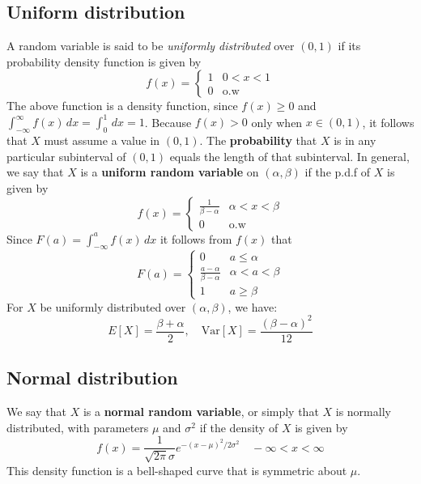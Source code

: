 \subsection{Uniform distribution}
A random variable is said to be \textit{uniformly distributed} over $(0,1)$ if its probability density function is given by \begin{equation}
    f(x)=\begin{cases}
        1& 0 < x < 1 \\
        0 & \mathrm{o.w}
        \end{cases}
\end{equation}
The above function is a density function, since $f(x)\geq 0$ and $\int_{-\infty}^{\infty} f(x) \, dx= \int _{0}^{1} \, dx=1$. Because $f(x)>0$ only when $x\in(0,1)$, it follows that $X$ must assume a value in $(0,1)$. The \textbf{probability} that $X$ is in any particular subinterval of $(0,1)$ equals the length of that subinterval. 
In general, we say that $X$ is a \textbf{uniform random variable} on $(\alpha,\beta)$ if the p.d.f of $X$ is given by
\begin{equation}
    f(x)=\begin{cases}
        \displaystyle{\frac{1}{\beta-\alpha}} & \alpha<x<\beta \\
        0 & \text{o.w}
        \end{cases}
\end{equation}
Since $F(a)=\int_{-\infty}^{a} f(x) \, dx$ it follows from $f(x)$ that \begin{equation}
F(a)=\begin{cases}
    0&a\leq \alpha \\
    \frac{a-\alpha}{\beta-\alpha} & \alpha < a < \beta \\
    1 & a \geq \beta
    \end{cases}
\end{equation}
For $X$ be uniformly distributed over $(\alpha,\beta)$, we have: 
$$E[X]=\frac{\beta+\alpha}{2}, \quad \mathrm{Var}[X]=\frac{(\beta-\alpha)^{2}}{12}$$
\subsection{Normal distribution}
We say that $X$ is a \textbf{normal random variable}, or simply that $X$ is normally distributed, with parameters $\mu$ and $\sigma^{2}$ if the density of $X$ is given by $$f(x)=\frac{1}{\sqrt{ 2\pi }\sigma}e^{-(x-\mu)^{2}/2\sigma^{2}}\quad -\infty< x< \infty$$
This density function is a bell-shaped curve that is symmetric about $\mu$. 

